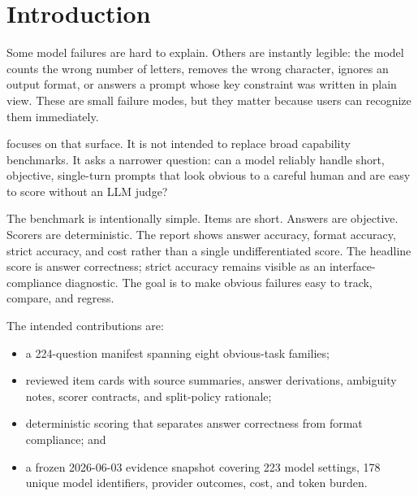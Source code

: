 \section{Introduction}

Some model failures are hard to explain. Others are instantly legible: the
model counts the wrong number of letters, removes the wrong character, ignores
an output format, or answers a prompt whose key constraint was written in plain
view. These are small failure modes, but they matter because users can
recognize them immediately.

\benchmarkname{} focuses on that surface. It is not intended to replace broad
capability benchmarks. It asks a narrower question: can a model reliably handle
short, objective, single-turn prompts that look obvious to a careful human and
are easy to score without an LLM judge?

The benchmark is intentionally simple. Items are short. Answers are objective.
Scorers are deterministic. The report shows answer accuracy, format accuracy,
strict accuracy, and cost rather than a single undifferentiated score. The
headline score is answer correctness; strict accuracy remains visible as an
interface-compliance diagnostic. The goal is to make obvious failures easy to
track, compare, and regress.

The intended contributions are:

\begin{itemize}
  \item a 224-question \paperSplit{} manifest spanning eight obvious-task
        families;
  \item reviewed item cards with source summaries, answer derivations,
        ambiguity notes, scorer contracts, and split-policy rationale;
  \item deterministic scoring that separates answer correctness from format
        compliance; and
  \item a frozen 2026-06-03 evidence snapshot covering 223 model settings,
        178 unique model identifiers, provider outcomes, cost, and token burden.
\end{itemize}
